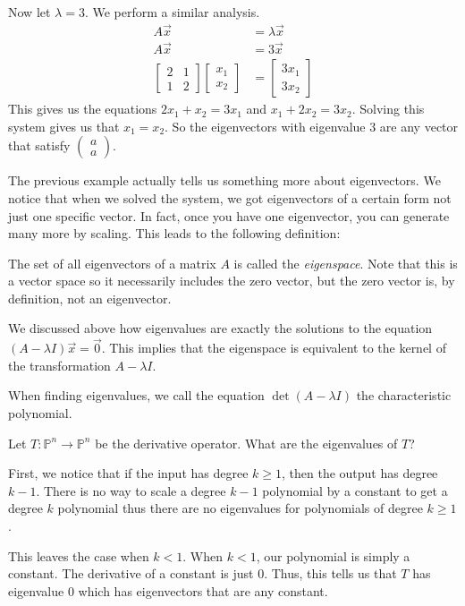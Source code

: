 \begin{example}
    Now let $\lambda=3$. We perform a similar analysis.
    \begin{align*}
        A\vec{x}&=\lambda\vec{x}\\
        A\vec{x}&=3\vec{x}\\
        \begin{bmatrix}
            2 & 1\\
            1 & 2
        \end{bmatrix}\begin{bmatrix}
            x_1 \\ x_2
        \end{bmatrix}&=\begin{bmatrix}
            3x_1 \\ 3x_2
        \end{bmatrix}
    \end{align*}
    This gives us the equations $2x_1+x_2=3x_1$ and $x_1+2x_2=3x_2$. Solving this system gives us that $x_1=x_2$. So the eigenvectors with eigenvalue $3$ are any vector that satisfy $\begin{pmatrix}
        a \\ a
    \end{pmatrix}$.
\end{example}
The previous example actually tells us something more about eigenvectors. We notice that when we solved the system, we got eigenvectors of a certain form not just one specific vector. In fact, once you have one eigenvector, you can generate many more by scaling. This leads to the following definition:
\begin{definition}
    The set of all eigenvectors of a matrix $A$ is called the \textit{eigenspace}. Note that this is a vector space so it necessarily includes the zero vector, but the zero vector is, by definition, not an eigenvector.
\end{definition}
\begin{remark}
    We discussed above how eigenvalues are exactly the solutions to the equation $(A-\lambda I)\vec{x}=\vec{0}$. This implies that the eigenspace is equivalent to the kernel of the transformation $A-\lambda I$.
\end{remark}
\begin{definition}
    When finding eigenvalues, we call the equation $\det(A-\lambda I)$ the characteristic polynomial.
\end{definition}
\begin{example}
    Let $T: \mathbb{P}^n\to\mathbb{P}^n$ be the derivative operator. What are the eigenvalues of $T$?

    First, we notice that if the input has degree $k\geq 1$, then the output has degree $k-1$. There is no way to scale a degree $k-1$ polynomial by a constant to get a degree $k$ polynomial thus there are no eigenvalues for polynomials of degree $k\geq 1$.

    This leaves the case when $k<1$. When $k<1$, our polynomial is simply a constant. The derivative of a constant is just $0$. Thus, this tells us that $T$ has eigenvalue $0$ which has eigenvectors that are any constant.
\end{example}
